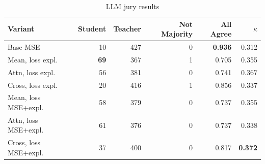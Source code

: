 \begin{table}[t]
  \centering
  \caption{LLM jury results}
  \label{tab:primary-results}
  \scriptsize
  \setlength{\tabcolsep}{2.2pt}
  \begin{tabular}{@{}lrrrrr@{}}
    \toprule
    Variant & Student & Teacher & Not Majority & All Agree &  $\kappa$ \\
    \midrule
    Base MSE & 10 & 427 & 0 & \textbf{0.936} &  0.312 \\
    Mean, loss expl. & \textbf{69} & 367 & 1 & 0.705 &  0.355 \\
    Attn, loss expl. & 56 & 381 & 0 & 0.741 &  0.367 \\
    Cross, loss expl. & 20 & 416 & 1 & 0.856 &  0.337 \\
    Mean, loss MSE+expl. & 58 & 379 & 0 & 0.737 &  0.355 \\
    Attn, loss MSE+expl. & 61 & 376 & 0 & 0.737 &  0.338 \\
    Cross, loss MSE+expl. & 37 & 400 & 0 & 0.817 &  \textbf{0.372} \\
    \bottomrule
  \end{tabular}
\end{table}



